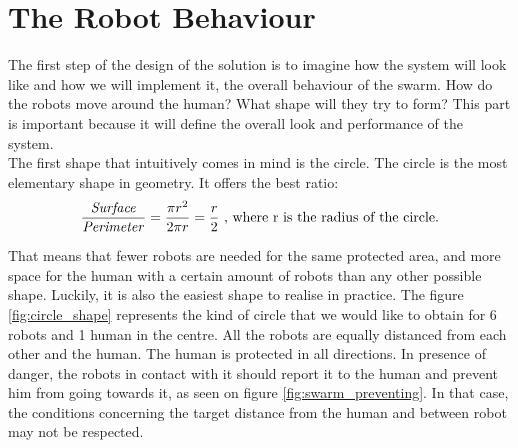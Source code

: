 \documentclass[oneside, a4paper, 12pt]{memoir}
\begin{document}
	\section{The Robot Behaviour}
	\label{sec:robot_behaviour}
	

	
	The first step of the design of the solution is to imagine how the system will look like and how we will implement it, the overall behaviour of the swarm. How do the robots move around the human? What shape will they try to form? This part is important because it will define the overall look and performance of the system.\\
	
	The first shape that intuitively comes in mind is the circle. The circle is the most elementary shape in geometry. It offers the best ratio:
	$$\frac{\mbox{\textit{Surface}}}{\mbox{\textit{Perimeter}}} = \frac{\pi r^2}{2\pi r} = \frac{r}{2}~\mbox{, where r is the radius of the circle.}$$
	
	That means that fewer robots are needed for the same protected area, and more space for the human with a certain amount of robots than any other possible shape. Luckily, it is also the easiest shape to realise in practice. The figure \ref{fig:circle_shape} represents the kind of circle that we would like to obtain for 6 robots and 1 human in the centre. All the robots are equally distanced from each other and the human. The human is protected in all directions. In presence of danger, the robots in contact with it should report it to the human and prevent him from going towards it, as seen on figure \ref{fig:swarm_preventing}. In that case, the conditions concerning the target distance from the human and between robot may not be respected.\\
	
\end{document}
